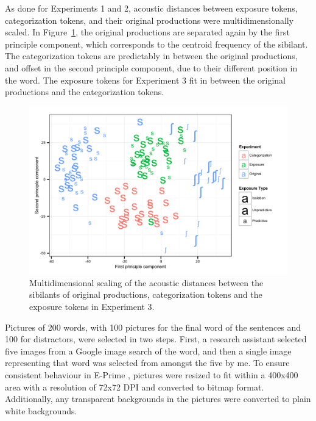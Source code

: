 As done for Experiments 1 and 2, acoustic distances between exposure tokens, categorization tokens, and their original productions were multidimensionally scaled.  In Figure~\ref{fig:exp3mds}, the original productions are separated again by the first principle component, which corresponds to the centroid frequency of the sibilant.
The categorization tokens are predictably in between the original productions, and offset in the second principle component, due to their different position in the word.
The exposure tokens for Experiment 3 fit in between the original productions and the categorization tokens.

\begin{figure}[ht]
\caption{Multidimensional scaling of the acoustic distances between the sibilants of original productions, categorization tokens and the exposure tokens in Experiment 3.}
\label{fig:exp3mds}
\begin{center}
\includegraphics[width=\textwidth]{graphs/exp3_mds}
\end{center}
\end{figure}

Pictures of 200 words, with 100 pictures for the final word of the sentences and 100 for distractors, were selected in two steps.  
First, a research assistant selected five images from a Google image search of the word, and then a single image representing that word was selected from amongst the five by me.  
To ensure consistent behaviour in E-Prime \citep{PsychologySoftwareTools2012}, pictures were resized to fit within a 400x400 area with a resolution of 72x72 DPI and converted to bitmap format.  
Additionally, any transparent backgrounds in the pictures were converted to plain white backgrounds.

